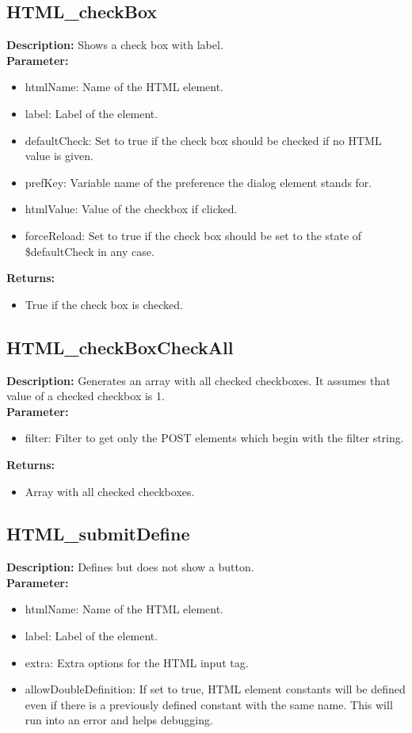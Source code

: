 \subsection{HTML\_checkBox}
\textbf{Description:} Shows a check box with label.\\
\textbf{Parameter:}
\begin{itemize}
\item htmlName: Name of the HTML element.
\item label: Label of the element.
\item defaultCheck: Set to true if the check box should be checked if no HTML value is given.
\item prefKey: Variable name of the preference the dialog element stands for.
\item htmlValue: Value of the checkbox if clicked.
\item forceReload: Set to true if the check box should be set to the state of \$defaultCheck in any case.
\end{itemize}
\textbf{Returns:}
\begin{itemize}
\item True if the check box is checked.
\end{itemize}

\subsection{HTML\_checkBoxCheckAll}
\textbf{Description:} Generates an array with all checked checkboxes. It assumes that value of a checked checkbox is 1.\\
\textbf{Parameter:}
\begin{itemize}
\item filter: Filter to get only the POST elements which begin with the filter string.
\end{itemize}
\textbf{Returns:}
\begin{itemize}
\item Array with all checked checkboxes.
\end{itemize}

\subsection{HTML\_submitDefine}
\textbf{Description:} Defines but does not show a button.\\
\textbf{Parameter:}
\begin{itemize}
\item htmlName: Name of the HTML element.
\item label: Label of the element.
\item extra: Extra options for the HTML input tag.
\item allowDoubleDefinition: If set to true, HTML element constants will be defined even if there is a previously defined constant with the same name. This will run into an error and helps debugging.
\end{itemize}

